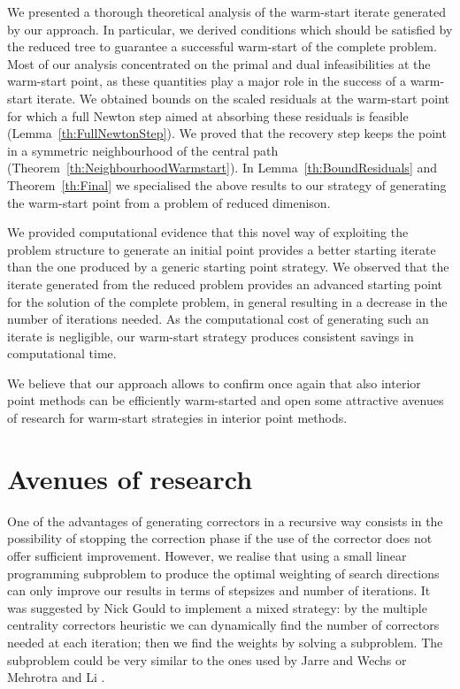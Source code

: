 We presented a thorough theoretical analysis of the warm-start
iterate generated by our approach.
In particular, we derived conditions 
which should be satisfied by the reduced tree to guarantee a successful 
warm-start of the complete problem. 
Most of our analysis concentrated on the primal and dual infeasibilities
at the warm-start point, as these quantities play a major role in the
success of a warm-start iterate.
We obtained bounds on the scaled residuals at the warm-start point
for which a full Newton step aimed at absorbing these residuals
is feasible (Lemma~\ref{th:FullNewtonStep}).
We proved that the recovery step keeps the point in a
symmetric neighbourhood of the central path
(Theorem~\ref{th:NeighbourhoodWarmstart}).
In Lemma~\ref{th:BoundResiduals} and Theorem~\ref{th:Final} we specialised
the above results to our strategy of generating the warm-start
point from a problem of reduced dimenison.

We provided computational evidence that this novel way 
of exploiting the problem structure to generate an initial point 
provides a better starting iterate than the one produced by a generic 
starting point strategy.
We observed that the iterate generated from the reduced problem
provides an advanced starting point for the solution of the complete problem,
in general resulting in a decrease in the number of iterations needed.
As the computational cost of generating such an iterate is negligible,
our warm-start strategy produces consistent savings in computational time.

We believe that our approach allows to confirm once again 
that also interior point methods can
be efficiently warm-started and open some attractive avenues of 
research for warm-start strategies in interior point methods.


%
%
\section{Avenues of research}

One of the advantages of generating correctors in a recursive way
consists in the possibility of stopping the correction phase
if the use of the corrector does not offer sufficient improvement.
However, we realise that using a small linear programming subproblem
to produce the optimal weighting of search directions can only improve
our results in terms of stepsizes and number of iterations.
It was suggested by Nick Gould to implement a mixed strategy:
by the multiple centrality correctors heuristic we can dynamically
find the number of correctors needed at each iteration; then we find
the weights by solving a subproblem.
The subproblem could be very similar to the ones used by
Jarre and Wechs \cite{JarreWechs} or Mehrotra and Li \cite{MehrotraLi}.

